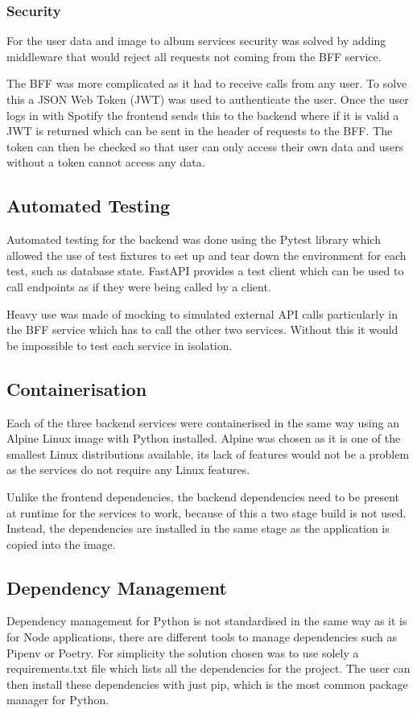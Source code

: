 \subsubsection{Security}
For the user data and image to album services security was solved by adding middleware that would reject all requests not coming from the BFF service.

The BFF was more complicated as it had to receive calls from any user. To solve this a JSON Web Token (JWT) was used to authenticate the user. Once the user logs in with Spotify the frontend sends this to the backend where if it is valid a JWT is returned which can be sent in the header of requests to the BFF. The token can then be checked so that user can only access their own data and users without a token cannot access any data.

\subsection{Automated Testing}
Automated testing for the backend was done using the Pytest library which allowed the use of test fixtures to set up and tear down the environment for each test, such as database state. FastAPI provides a test client which can be used to call endpoints as if they were being called by a client.

Heavy use was made of mocking to simulated external API calls particularly in the BFF service which has to call the other two services. Without this it would be impossible to test each service in isolation.

\subsection{Containerisation}
Each of the three backend services were containerised in the same way using an Alpine Linux image with Python installed. Alpine was chosen as it is one of the smallest Linux distributions available, its lack of features would not be a problem as the services do not require any Linux features.

Unlike the frontend dependencies, the backend dependencies need to be present at runtime for the services to work, because of this a two stage build is not used. Instead, the dependencies are installed in the same stage as the application is copied into the image.

\subsection{Dependency Management}
Dependency management for Python is not standardised in the same way as it is for Node applications, there are different tools to manage dependencies such as Pipenv or Poetry. For simplicity the solution chosen was to use solely a requirements.txt file which lists all the dependencies for the project. The user can then install these dependencies with just pip, which is the most common package manager for Python.

